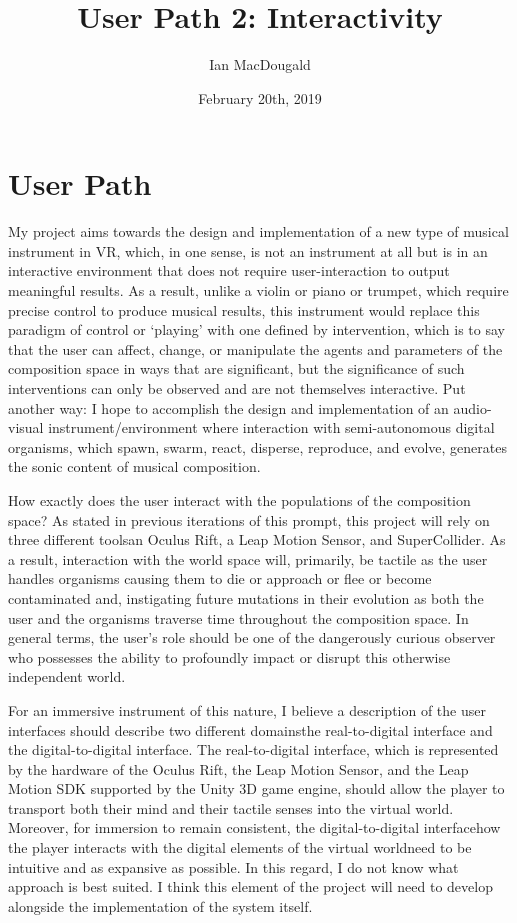 \documentclass[12pt]{article}
\title{User Path 2: Interactivity}
\author{Ian MacDougald}
\date{February 20th, 2019}
\begin{document}
	\setlength{\droptitle}{-10em}
	\maketitle
	\onehalfspacing
	\section*{User Path}
	
	My project aims towards the design and implementation of a new type of musical instrument in VR, which, in one sense, is not an instrument at all but is in an interactive environment that does not require user-interaction to output meaningful results. As a result, unlike a violin or piano or trumpet, which require precise control to produce musical results, this instrument would replace this paradigm of control or `playing' with one defined by intervention, which is to say that the user can affect, change, or manipulate the agents and parameters of the composition space in ways that are significant, but the significance of such interventions can only be observed and are not themselves interactive. Put another way: I hope to accomplish the design and implementation of an audio-visual instrument/environment where interaction with semi-autonomous digital organisms, which spawn, swarm, react, disperse, reproduce, and evolve, generates the sonic content of musical composition. 
	
	How exactly does the user interact with the populations of the composition space? As stated in previous iterations of this prompt, this project will rely on three different tools\textemdash an Oculus Rift, a Leap Motion Sensor, and SuperCollider. As a result, interaction with the world space will, primarily, be tactile as the user handles organisms causing them to die or approach or flee or become contaminated and, instigating future mutations in their evolution as both the user and the organisms traverse time throughout the composition space. In general terms, the user's role should be one of the dangerously curious observer who possesses the ability to profoundly impact or disrupt this otherwise independent world. 
	
	For an immersive instrument of this nature, I believe a description of the user interfaces should describe two different domains\textemdash the real-to-digital interface and the digital-to-digital interface. The real-to-digital interface, which is represented by the hardware of the Oculus Rift, the Leap Motion Sensor, and the Leap Motion SDK supported by the Unity 3D game engine, should allow the player to transport both their mind and their tactile senses into the virtual world. Moreover, for immersion to remain consistent, the digital-to-digital interface\textemdash how the player interacts with the digital elements of the virtual world\textemdash need to be intuitive and as expansive as possible. In this regard, I do not know what approach is best suited. I think this element of the project will need to develop alongside the implementation of the system itself. 
\end{document}
